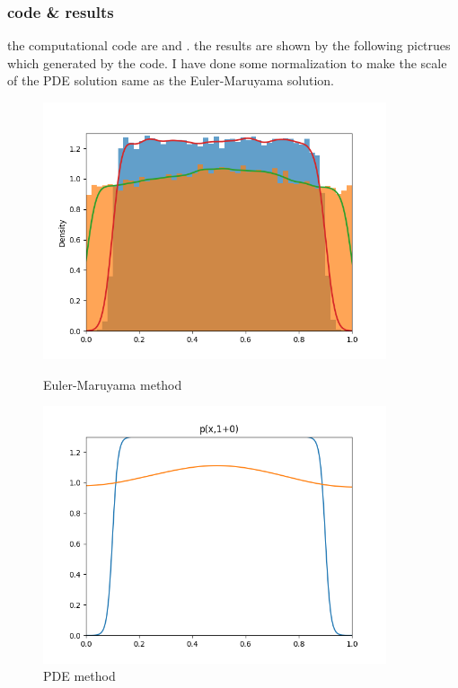 \documentclass{article}
\theoremstyle{definition} %
\begin{document}
\subsubsection{code \& results}
the computational code are \cite[Euler-Maruyama]{HEAT-EM} and \cite[PDE]{HEAT-PDE}.
the results are shown by the following pictrues which
generated by the code.
I have done some normalization to make the scale of
the PDE solution same as the Euler-Maruyama solution.
\begin{figure}[ht!]
    \centering
    \begin{minipage}{0.45\textwidth}
        \centering
        \includegraphics[width=0.9\textwidth]{fig/distributioncombine.png} %
        \caption{Euler-Maruyama method}
        \label{fig:fig4}
    \end{minipage}\hfill
    \begin{minipage}{0.45\textwidth}
        \centering
        \includegraphics[width=0.9\textwidth]{fig/p(x,1+0).png} %
        \caption{PDE method}
    \end{minipage}
\end{figure}
\end{document}
